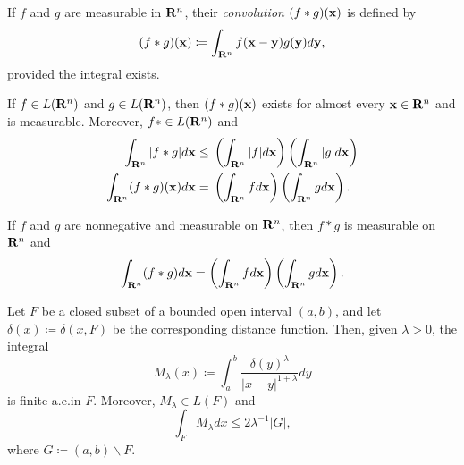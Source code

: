 If $f$ and $g$ are measurable in $\mathbf{R}^n$, their \emph{convolution
  $(f*g)(\mathbf{x})$} is defined by
\[
(f*g)(\mathbf{x})\coloneqq\int_{\mathbf{R}^n}f(\mathbf{x}-\mathbf{y})g(\mathbf{y}) d \mathbf{y},
\]
provided the integral exists.
\begin{theorem*}[6.14]
If $f\in L(\mathbf{R}^n)$ and $g\in L(\mathbf{R}^n)$, then $(f*g)(\mathbf{x})$ exists for
almost every $\mathbf{x}\in\mathbf{R}^n$ and is measurable. Moreover, $f*\in
L(\mathbf{R}^n)$ and
\[
\begin{aligned}
\int_{\mathbf{R}^n}|f*g| d \mathbf{x}
\leq{}&\left(\int_{\mathbf{R}^n}|f| d \mathbf{x}\right)\left(\int_{\mathbf{R}^n}|g| d \mathbf{x}\right)\\
\int_{\mathbf{R}^n}(f*g)(\mathbf{x}) d \mathbf{x}
={}&\left(\int_{\mathbf{R}^n}f d \mathbf{x}\right)\left(\int_{\mathbf{R}^n}g d \mathbf{x}\right).
\end{aligned}
\]
\end{theorem*}
\begin{corollary*}[6.16]
If $f$ and $g$ are nonnegative and measurable on $\mathbf{R}^n$, then $f*g$ is
measurable on $\mathbf{R}^n$ and
\[
\int_{\mathbf{R}^n}(f*g) d \mathbf{x}=
\left(\int_{\mathbf{R}^n} f d \mathbf{x}\right)
\left(\int_{\mathbf{R}^n}g d \mathbf{x}\right).
\]
\end{corollary*}
\begin{theorem*}[6.17, Marcinkiewicz]
Let $F$ be a closed subset of a bounded open interval $(a,b)$, and let
$\delta(x)\coloneqq\delta(x,F)$ be the corresponding distance
function. Then, given $\lambda>0$, the integral
\[
M_\lambda(x)\coloneqq\int_a^b\frac{\delta(y)^\lambda}{|x-y|^{1+\lambda}} d  y
\]
is finite a.e.\@ in $F$. Moreover, $M_\lambda\in L(F)$ and
\[
\int_F M_\lambda d  x\leq 2\lambda^{-1}|G|,
\]
where $G\coloneqq(a,b)\smallsetminus F$.
\end{theorem*}

